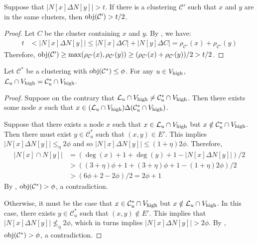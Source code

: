 \begin{lemma}\label{lem:samecluster} Suppose that $|N[x] \Delta N[y]| > t$. If there is a clustering $\mathcal{C}'$ such that $x$ and $y$ are in the same clusters, then $\mathrm{obj}(\mathcal{C}') > t/2$. \end{lemma}
\begin{proof}
Let $C$ be the cluster containing $x$ and $y$. By , we have: 
\begin{align*}
t &< |N[x] \Delta N[y]| \leq |N[x]\Delta C| + |N[y] \Delta C|= \rho_{\mathcal{C'}}(x) + \rho_{\mathcal{C'}}(y) 
\end{align*}
Therefore, $\mathrm{obj}(\mathcal{C}') \geq \max(\rho_{\mathcal{C'}}(x),  \rho_{\mathcal{C'}}(y)) \geq (\rho_{\mathcal{C'}}(x) + \rho_{\mathcal{C'}}(y) )/2 > t/2$.
\end{proof}


\begin{lemma}\label{lem:highdegreeclustering}
Let $\mathcal{C}^{*}$ be a clustering with $\mathrm{obj}(\mathcal{C}^{*}) \leq \phi$. For any $u \in V_{\operatorname{high}}$, $\mathcal{L}_u \cap V_{\operatorname{high}} = \mathcal{C}^{*}_{u} \cap V_{\operatorname{high}}$. 
\end{lemma}
\begin{proof}
Suppose on the contrary that $\mathcal{L}_u \cap V_{\operatorname{high}} \neq \mathcal{C}^{*}_{u} \cap V_{\operatorname{high}}$. Then there exists some node $x$ such that $x \in (\mathcal{L}_u \cap V_{\operatorname{high}}) \Delta (\mathcal{C}^{*}_{u} \cap V_{\operatorname{high}})$.

Suppose that there exists a node $x$ such that $x \in \mathcal{L}_u \cap V_{\operatorname{high}}$ but  $x \notin \mathcal{C}^{*}_{u} \cap V_{\operatorname{high}}$. Then there must exist $y \in \mathcal{C}^{*}_{u}$ such that $(x,y) \in E'$. This implies $|N[x] \Delta N[y]| \leq_{\eta} 2\phi$ and so $|N[x] \Delta N[y]| \leq (1+\eta) 2\phi$. Therefore,
\begin{align*}
|N[x] \cap N[y]| &= (\deg(x) +1 + \deg(y)+ 1 - |N[x] \Delta N[y]|)/2 \\
&> ((3+\eta)\phi + 1 + (3+\eta)\phi + 1 - (1+\eta)2\phi ) / 2 \\
&> (6\phi + 2  - 2\phi)/2 = 2\phi + 1
\end{align*}
By , $\mathrm{obj}(\mathcal{C}^{*}) > \phi$, a contradiction.

Otherwise, it must be the case that $x \in \mathcal{C}^{*}_{u} \cap V_{\operatorname{high}}$ but $x \notin \mathcal{L}_u \cap V_{\operatorname{high}}$. In this case, there exists $y \in \mathcal{C}^{*}_u$ such that $(x,y) \notin E'$. This implies that $|N[x] \Delta N[y]| \nleq_{\eta} 2\phi$, which in turns implies $|N[x] \Delta N[y]| > 2\phi$. By , $\mathrm{obj}(\mathcal{C}^{*}) > \phi$, a contradiction.

\end{proof}

